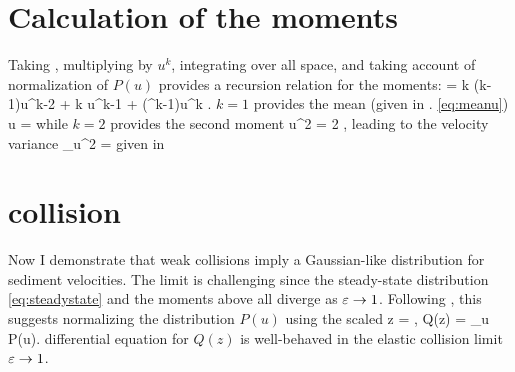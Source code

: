 \section{Calculation of the moments}
\label{sec:langmoments}
Taking \DIFdelbegin \DIFdel{(\ref{eq:master})}\DIFdelend \DIFaddbegin {}\DIFaddend , multiplying by $u^k$, integrating over all space, and taking account of normalization of $P(u)$ provides a recursion relation for the moments: 
 =  k (k-1)\langle u^{k-2} \rangle + \tilde{\Gamma} k \langle u^{k-1} \rangle + (\ve^k-1)\langle u^k \rangle. \ee
$k=1$ provides the mean (given in \DIFdelbegin {}\DIFdelend \DIFaddbegin {}\DIFaddend . \ref{eq:meanu})
\be \langle u \rangle =  \DIFdelbegin {}\DIFdelend \DIFaddbegin {}\DIFaddend \ee
while $k=2$ provides the second moment
\be \langle u^2 \rangle = 2 , \ee
leading to the velocity variance
\be \sigma_u^2 = \ee
given in \DIFdelbegin {}\DIFdelend \DIFaddbegin {}\DIFaddend \section{\DIFdelbegin {}\DIFdelend \DIFaddbegin {}\DIFaddend collision \DIFdelbegin {}\DIFdelend \DIFaddbegin {}\DIFaddend }
\label{sec:langextremes}
Now I \DIFaddbegin {}\DIFaddend demonstrate that weak collisions imply a Gaussian-like distribution for sediment velocities. The limit is challenging since the steady-state distribution \DIFaddbegin {}\DIFaddend \ref{eq:steadystate} and the moments above all diverge as $\varepsilon \rightarrow 1$.
Following \cite{Hall1989}, this \DIFaddbegin {}\DIFaddend suggests normalizing the distribution $P(u)$ using the scaled \DIFdelbegin {}\DIFdelend \DIFaddbegin {}\DIFaddend \be z = , \ee
\DIFdelbegin {}\DIFdelend \DIFaddbegin {}\DIFaddend \be Q(z) = \sigma_u P(u).\ee
\DIFdelbegin {}\DIFdelend \DIFaddbegin {}\DIFaddend differential equation for $Q(z)$ \DIFdelbegin {}\DIFdelend is well-behaved in the elastic collision limit $\varepsilon \rightarrow 1$.
